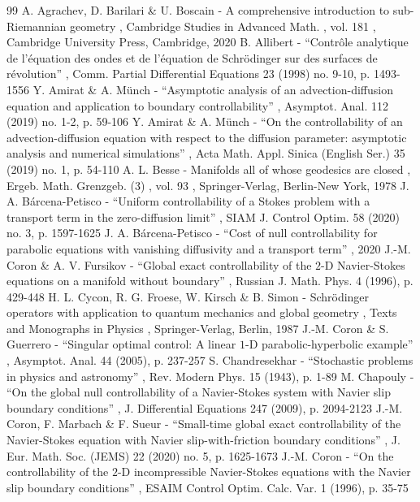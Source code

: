 \begin{thebibliography}{99}
 A. Agrachev, D. Barilari \& U. Boscain - A comprehensive introduction to sub-Riemannian geometry , Cambridge Studies in Advanced Math. , vol. 181 , Cambridge University Press, Cambridge, 2020
 B. Allibert - “Contrôle analytique de l’équation des ondes et de l’équation de Schrödinger sur des surfaces de révolution” , Comm. Partial Differential Equations 23 (1998) no. 9-10, p. 1493-1556
 Y. Amirat \& A. Münch - “Asymptotic analysis of an advection-diffusion equation and application to boundary controllability” , Asymptot. Anal. 112 (2019) no. 1-2, p. 59-106
 Y. Amirat \& A. Münch - “On the controllability of an advection-diffusion equation with respect to the diffusion parameter: asymptotic analysis and numerical simulations” , Acta Math. Appl. Sinica (English Ser.) 35 (2019) no. 1, p. 54-110
 A. L. Besse - Manifolds all of whose geodesics are closed , Ergeb. Math. Grenzgeb. (3) , vol. 93 , Springer-Verlag, Berlin-New York, 1978
 J. A. Bárcena-Petisco - “Uniform controllability of a Stokes problem with a transport term in the zero-diffusion limit” , SIAM J. Control Optim. 58 (2020) no. 3, p. 1597-1625
 J. A. Bárcena-Petisco - “Cost of null controllability for parabolic equations with vanishing diffusivity and a transport term” , 2020
 J.-M. Coron \& A. V. Fursikov - “Global exact controllability of the $2$-D Navier-Stokes equations on a manifold without boundary” , Russian J. Math. Phys. 4 (1996), p. 429-448
 H. L. Cycon, R. G. Froese, W. Kirsch \& B. Simon - Schrödinger operators with application to quantum mechanics and global geometry , Texts and Monographs in Physics , Springer-Verlag, Berlin, 1987
 J.-M. Coron \& S. Guerrero - “Singular optimal control: A linear $1$-D parabolic-hyperbolic example” , Asymptot. Anal. 44 (2005), p. 237-257
 S. Chandresekhar - “Stochastic problems in physics and astronomy” , Rev. Modern Phys. 15 (1943), p. 1-89
 M. Chapouly - “On the global null controllability of a Navier-Stokes system with Navier slip boundary conditions” , J. Differential Equations 247 (2009), p. 2094-2123
 J.-M. Coron, F. Marbach \& F. Sueur - “Small-time global exact controllability of the Navier-Stokes equation with Navier slip-with-friction boundary conditions” , J. Eur. Math. Soc. (JEMS) 22 (2020) no. 5, p. 1625-1673
 J.-M. Coron - “On the controllability of the $2$-D incompressible Navier-Stokes equations with the Navier slip boundary conditions” , ESAIM Control Optim. Calc. Var. 1 (1996), p. 35-75

\end{thebibliography}
